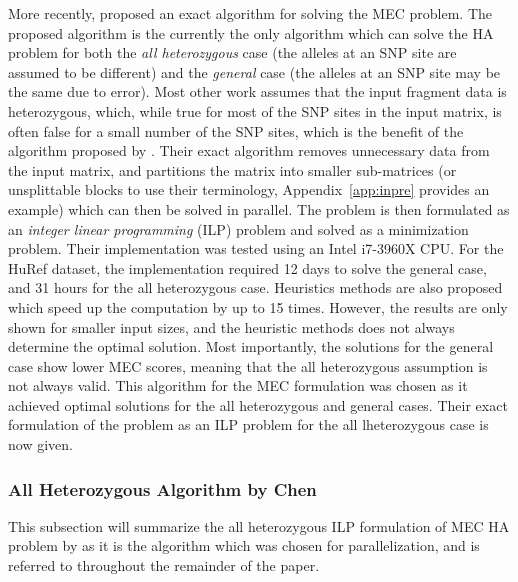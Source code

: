 \documentclass[10pt,twocolumn]{article}
\begin{document}
More recently, \cite{chen:2013} proposed an exact algorithm for solving the MEC problem. The proposed
algorithm is the currently the only algorithm which can solve the HA problem for both the \textit{all heterozygous}
case (the alleles at an SNP site are assumed to be different) and the \textit{general} case (the 
alleles at an SNP site may be the same due to error). Most other work assumes that the input fragment data is 
heterozygous, which, while true for most of the SNP sites in the input matrix, is often false for a small 
number of the SNP sites, which is the benefit of the algorithm proposed by \cite{chen:2013}. Their exact
algorithm removes unnecessary data from the input matrix, and partitions the matrix into smaller sub-matrices
(or unsplittable blocks to use their terminology, Appendix~\ref{app:inpre} provides an example) which can then 
be solved in parallel. The problem is then formulated as an \textit{integer linear programming} (ILP) problem 
and solved as a minimization problem. Their implementation was tested using an Intel i7-3960X CPU. For the 
HuRef dataset, the implementation required 12 days to solve the general case, and 31 hours for the all heterozygous case. 
Heuristics methods are also proposed which speed up the computation by up to 15 times. However, the results 
are only shown for smaller input sizes, and the heuristic methods does  not always determine the optimal 
solution. Most importantly, the solutions for the general case show lower MEC scores, meaning that the 
all heterozygous assumption is not always valid. This algorithm for the MEC formulation was chosen as it
achieved optimal solutions for the all heterozygous and general cases. Their exact formulation of the problem
as an ILP problem for the all lheterozygous case is now given.

\subsubsection{All Heterozygous Algorithm by Chen} \label{sec:allhetro}

This subsection will summarize the all heterozygous ILP formulation of MEC HA problem by \cite{chen:2013} as
it is the algorithm
which was chosen for parallelization, and is referred to throughout the remainder of the paper.
\end{document}
